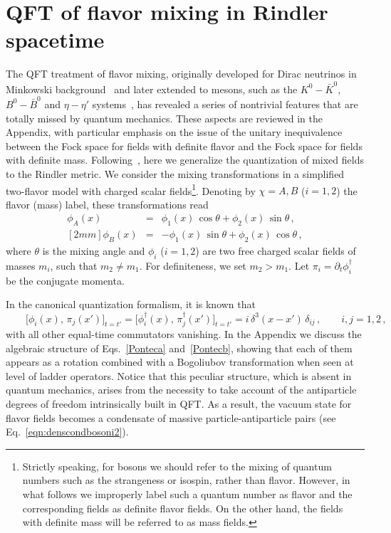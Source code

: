 \documentclass[floats,prd,aps,amssymb,nofootinbib,showkeys]{revtex4}
\newcommand{\bea}{\begin{eqnarray}}\newcommand{\eea}{\end{eqnarray}}
\begin{document}
\section{QFT of flavor mixing in Rindler spacetime}
\label{QFTRIND}
The QFT treatment of flavor mixing, originally developed
for Dirac neutrinos in Minkowski background~\cite{BV95} 
and later extended to mesons, such as the
$K^0-\bar K^{0}$, $B^0-\bar B^0$ and $\eta-\eta'$ systems~\cite{BlasCap,Ji}, has revealed a series of nontrivial features that are totally missed by quantum mechanics. 
These aspects are reviewed in the Appendix,  
with particular emphasis on the issue of the 
unitary inequivalence between the Fock space for fields with definite flavor and the Fock space for fields
with definite mass.  Following~\cite{Luciano}, here we generalize the quantization 
of mixed fields to the Rindler metric. 
We consider the mixing transformations in a simplified two-flavor 
model with charged scalar fields\footnote{Strictly speaking, 
for bosons we should refer to the mixing of quantum numbers such as the strangeness or isospin, rather than flavor.
However, in what follows we improperly label
such a quantum number as flavor and the corresponding 
fields as definite flavor fields. On the other hand, the fields with definite
mass will be referred to as mass fields.}. Denoting by $\chi=A,B$ ($i=1,2$)
the flavor (mass) label, these transformations read
\bea 
\label{Ponteca}
\phi_{A}(x)&=& \phi_{1}(x)\, \cos\theta  + \phi_{2}(x)\, \sin\theta\,,\\ [2mm]
\label{Pontecb}
\phi_{B}(x) &=&-  \phi_{1}(x)\, \sin\theta   +  \phi_{2}(x)\, \cos\theta\,,
\eea
where $\theta$ is the mixing angle and
$\phi_i$ ($i=1,2$) are two free charged scalar fields
of masses $m_i$, such that $m_2\neq m_1$.  For definiteness, 
we set $m_2>m_1$. Let $\pi_i=\partial_t\phi_i^\dagger$
be the conjugate momenta.

In the canonical quantization formalism, it is known that
\begin{equation}
\qquad\big[\phi_i(x),\,\pi_j(x')\big]_{t=t'}=\big[\phi^\dagger_i(x),\,\pi^\dagger_j(x')\big]_{t=t'}=i\,\delta^3(x-x')\,\delta_{ij}\,,\qquad i,j=1,2\,,
\label{eqn:relcommcan}
\end{equation}
with all other equal-time commutators vanishing.
In the Appendix we discuss the algebraic structure
of Eqs.~\eqref{Ponteca} and~\eqref{Pontecb}, showing that each of them
appears as a rotation combined with a Bogoliubov transformation 
when seen at level of ladder operators.
Notice that this peculiar structure, which is absent in quantum mechanics, arises from the necessity to take account of the
antiparticle degrees of freedom intrinsically 
built in QFT. 
As a result, the vacuum state for flavor fields
becomes a condensate of massive particle-antiparticle pairs (see Eq.~\eqref{eqn:denscondbosoni2}). 
\end{document}
